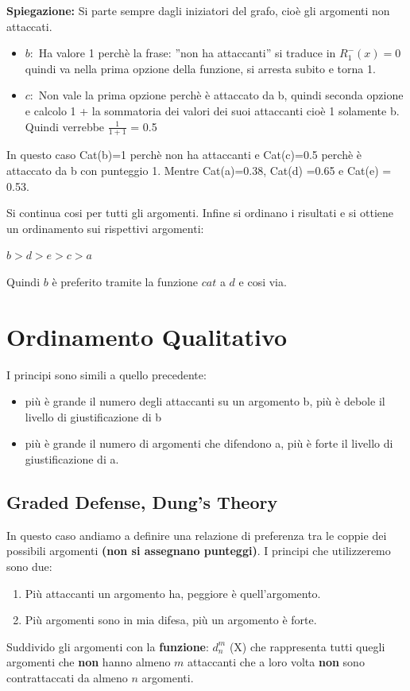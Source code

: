 \textbf{Spiegazione: } Si parte sempre dagli iniziatori del grafo, cioè gli argomenti non attaccati.
\begin{itemize}
    \item $b:$ Ha valore 1 perchè la frase: ”non ha attaccanti” si traduce in $R^-_1(x) = 0$ quindi va nella prima opzione della funzione, si arresta subito e torna 1.
    \item $c:$ Non vale la prima opzione perchè è attaccato da b, quindi seconda opzione e calcolo 1 + la sommatoria dei valori dei suoi attaccanti cioè 1 solamente b. Quindi verrebbe $\frac{1}{1+1}$ = 0.5
\end{itemize}
In questo caso Cat(b)=1 perchè non ha attaccanti e Cat(c)=0.5 perchè è attaccato da b con punteggio 1. Mentre Cat(a)=0.38, Cat(d) =0.65 e Cat(e) = 0.53.

\vspace{0.3cm}

Si continua cosi per tutti gli argomenti. Infine si ordinano i risultati e si ottiene un ordinamento sui rispettivi argomenti:
\begin{center}
    $b>d>e>c>a$
\end{center}
Quindi $b$ è preferito tramite la funzione $cat$ a $d$ e cosi via.
\section{Ordinamento Qualitativo}
I principi sono simili a quello precedente:
\begin{itemize}
    \item più è grande il numero degli attaccanti su un argomento b, più è debole il livello di giustificazione di b
    \item più è grande il numero di argomenti che difendono a, più è forte il livello di giustificazione di a.
\end{itemize}
\subsection{Graded Defense, Dung’s Theory}
In questo caso andiamo a definire una relazione di preferenza tra le coppie dei possibili argomenti \textbf{(non si assegnano punteggi)}. I principi che utilizzeremo sono due:
\begin{enumerate}
    \item Più attaccanti un argomento ha, peggiore è quell’argomento.
    \item Più argomenti sono in mia difesa, più un argomento è forte.
    
\end{enumerate}
Suddivido gli argomenti con la \textbf{funzione}: $d^m_n$ (X) che rappresenta tutti quegli argomenti che \textbf{non} hanno almeno $m$ attaccanti che a loro volta \textbf{non} sono contrattaccati da almeno $n$ argomenti.

